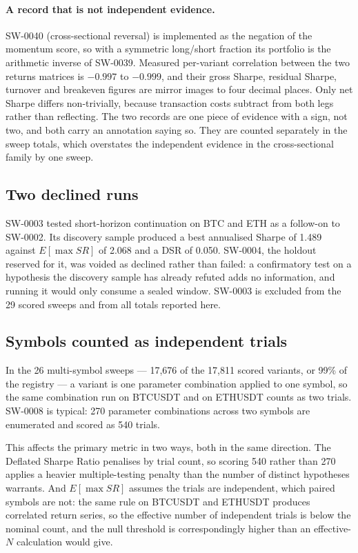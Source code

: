 \documentclass[11pt,a4paper]{article}
\begin{document}
\paragraph{A record that is not independent evidence.}
SW-0040 (cross-sectional reversal) is implemented as the negation of the
momentum score, so with a symmetric long/short fraction its portfolio is the
arithmetic inverse of SW-0039. Measured per-variant correlation between the
two returns matrices is $-0.997$ to $-0.999$, and their gross Sharpe, residual
Sharpe, turnover and breakeven figures are mirror images to four decimal
places. Only net Sharpe differs non-trivially, because transaction costs
subtract from both legs rather than reflecting. The two records are one piece
of evidence with a sign, not two, and both carry an annotation saying so. They
are counted separately in the sweep totals, which overstates the independent
evidence in the cross-sectional family by one sweep.

\subsection{Two declined runs}

SW-0003 tested short-horizon continuation on BTC and ETH as a follow-on to
SW-0002. Its discovery sample produced a best annualised Sharpe of 1.489
against $E[\max SR]$ of 2.068 and a DSR of 0.050. SW-0004, the holdout
reserved for it, was voided as declined rather than failed: a confirmatory
test on a hypothesis the discovery sample has already refuted adds no
information, and running it would only consume a sealed window. SW-0003 is
excluded from the 29 scored sweeps and from all totals reported here.

\subsection{Symbols counted as independent trials}

In the 26 multi-symbol sweeps --- 17{,}676 of the 17{,}811 scored variants, or
99\% of the registry --- a variant is one parameter combination applied to one
symbol, so the same combination run on BTCUSDT and on ETHUSDT counts as two
trials. SW-0008 is typical: 270 parameter combinations across two symbols are
enumerated and scored as 540 trials.

This affects the primary metric in two ways, both in the same direction.
The Deflated Sharpe Ratio penalises by trial count, so scoring 540 rather than
270 applies a heavier multiple-testing penalty than the number of distinct
hypotheses warrants. And $E[\max SR]$ assumes the trials are independent,
which paired symbols are not: the same rule on BTCUSDT and ETHUSDT produces
correlated return series, so the effective number of independent trials is
below the nominal count, and the null threshold is correspondingly higher than
an effective-$N$ calculation would give.
\end{document}
